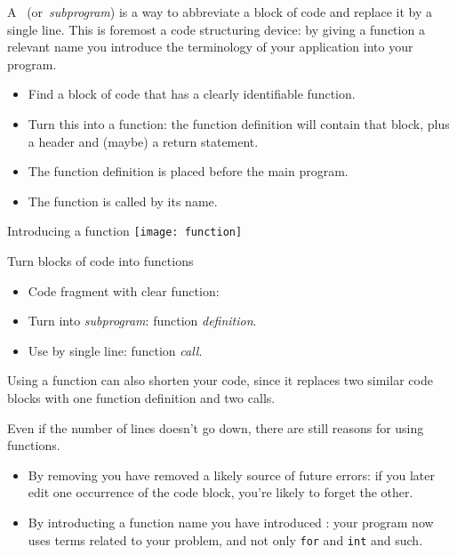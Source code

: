 
A~
(or~\emph{subprogram}) is a way to
abbreviate a block of code and replace it by a single line.
This is foremost a code structuring device: by giving a function a
relevant name you introduce the terminology of your application into
your program.

\begin{itemize}
\item Find a block of code that has a clearly identifiable function.
\item Turn this into a function: the function definition will contain
  that block, plus a header and (maybe) a return statement.
\item The function definition is placed before the main program.
\item The function is called by its name.
\end{itemize}

\begin{block}{Introducing a function}
  \label{sl:func-scheme}
  \texttt{[image: function]}
\end{block}

\begin{slide}{Turn blocks of code into functions}
  \label{sl:function-intro}
  \begin{itemize}
  \item Code fragment with clear function:
  \item Turn into \emph{subprogram}: function \emph{definition}.
  \item Use by single line: function \emph{call}.
  \end{itemize}
\end{slide}

Using a function can also shorten your code, since it replaces two similar
code blocks with one function definition and two calls.

Even if the number of lines doesn't go down, there are still reasons
for using functions.
\begin{itemize}
\item By removing  you have removed a
  likely source of future errors: if you later edit one occurrence of
  the code block, you're likely to forget the other.
\item By introducting a function name you have introduced
  : your program now uses terms related to your
  problem, and not only \lstinline{for} and \lstinline{int} and such.
\end{itemize}

